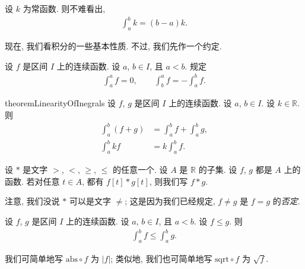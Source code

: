 \begin{example}
    设 $k$ 为常函数. 则不难看出,
    \begin{align*}
        \int_{a}^{b} {k} = (b - a)k.
    \end{align*}
\end{example}

现在, 我们看积分的一些基本性质. 不过, 我们先作一个约定.

\begin{definition}
    设 $f$ 是区间 $I$ 上的连续函数. 设 $a$, $b \in I$, 且 $a < b$. 规定
    \begin{align*}
        \int_{a}^{a} {f} = 0, \qquad \int_{b}^{a} {f} = -\int_{a}^{b} {f}.
    \end{align*}
\end{definition}

\begin{restatable}{theorem}{LinearityOfInegrals}
    设 $f$, $g$ 是区间 $I$ 上的连续函数. 设 $a$, $b \in I$. 设 $k \in \mathbb{R}$. 则
    \begin{align*}
        \int_{a}^{b} {(f + g)} & = \int_{a}^{b} {f} + \int_{a}^{b} {g}, \\
        \int_{a}^{b} {kf}      & = k \int_{a}^{b} {f}.
    \end{align*}
\end{restatable}

\begin{definition}
    设 $\ast$ 是文字 $>$, $<$, $\geq$, $\leq$ 的任意一个. 设 $A$ 是 $\mathbb{R}$ 的子集. 设 $f$, $g$ 都是 $A$ 上的函数. 若对任意 $t \in A$, 都有 $f[t] \ast g[t]$, 则我们写 $f \ast g$.
\end{definition}

\begin{remark}
    注意, 我们没说 $\ast$ 可以是文字 $\neq$; 这是因为我们已经规定, $f \neq g$ 是 $f = g$ 的\emph{否定}.
\end{remark}

\begin{theorem}
    设 $f$, $g$ 是区间 $I$ 上的连续函数. 设 $a$, $b \in I$, 且 $a < b$. 设 $f \leq g$. 则
    \begin{align*}
        \int_{a}^{b} {f} \leq \int_{a}^{b} {g}.
    \end{align*}
\end{theorem}

\begin{definition}
    我们可简单地写 $\mathrm{abs} \circ f$ 为 $|f|$; 类似地, 我们也可简单地写 $\mathrm{sqrt} \circ f$ 为 $\sqrt{f}$.
\end{definition}

